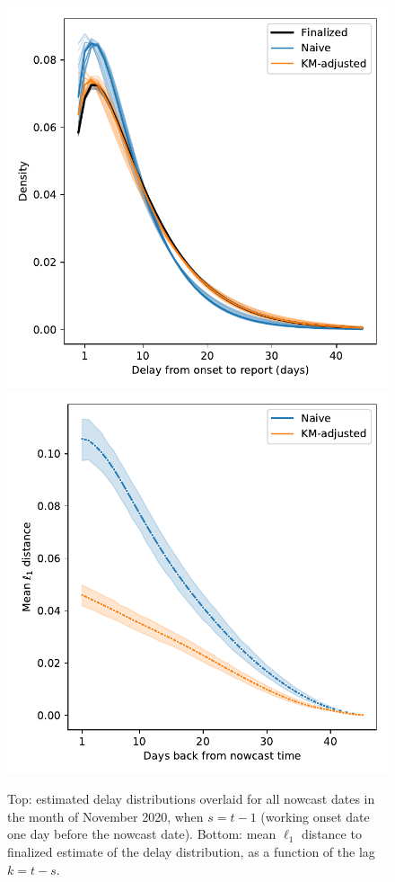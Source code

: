 \documentclass[sts]{imsart}
\theoremstyle{plain}
\theoremstyle{definition}
\theoremstyle{remark}
\begin{document}
\begin{figure}[tb]
\centering
\includegraphics[width=0.85\linewidth]{./figures/range_overlay.pdf}
\includegraphics[width=0.85\linewidth]{./figures/l1_summary.pdf}
\caption{Top: estimated delay distributions overlaid for all nowcast dates in
  the month of November 2020, when $s=t-1$ (working onset date one day 
  before the nowcast date). Bottom: mean $\ell_1$ distance to finalized
  estimate of the delay distribution, as a function of the lag $k=t-s$.}     
\label{fig:delay_dist_realtime}
\end{figure}
\end{document}
